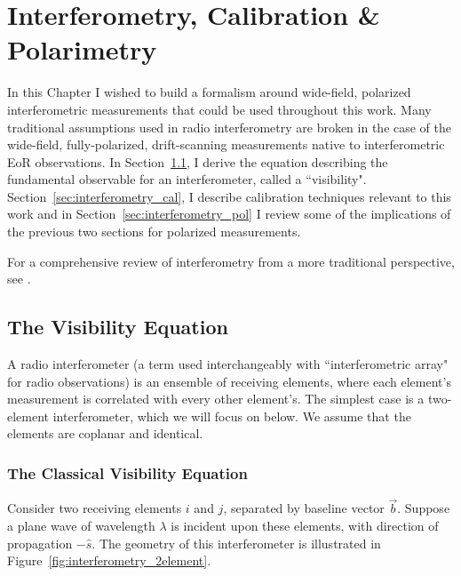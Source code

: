 \chapter{Interferometry, Calibration \& Polarimetry}
\label{chapter:interferometry}

In this Chapter I wished to build a formalism around wide-field, polarized interferometric measurements that could be used throughout this work. Many traditional assumptions used in radio interferometry are broken in the case of the wide-field, fully-polarized, drift-scanning measurements native to interferometric EoR observations. In Section~\ref{sec:interferometry_vis}, I derive the equation describing the fundamental observable for an interferometer, called a ``visibility". Section~\ref{sec:interferometry_cal}, I describe calibration techniques relevant to this work and in Section~\ref{sec:interferometry_pol} I review some of the implications of the previous two sections for polarized measurements.

For a comprehensive review of interferometry from a more traditional perspective, see \cite{TMS}.

\section{The Visibility Equation}
\label{sec:interferometry_vis}

A radio interferometer (a term used interchangeably with ``interferometric array" for radio observations) is an ensemble of receiving elements, where each element's measurement is correlated with every other element's. The simplest case is a two-element interferometer, which we will focus on below. We assume that the elements are coplanar and identical.

\subsection{The Classical Visibility Equation}

Consider two receiving elements $i$ and $j$, separated by baseline vector $\vec{b}$. Suppose a plane wave of wavelength $\lambda$ is incident upon these elements, with direction of propagation $-\hat{s}$. The geometry of this interferometer is illustrated in Figure~\ref{fig:interferometry_2element}.


